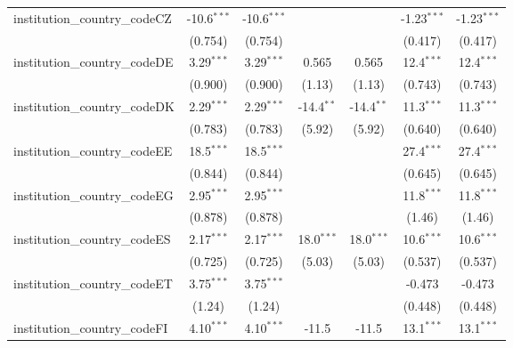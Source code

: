 \begin{tabular}{lcccccc}
   institution\_country\_codeCZ          & -10.6$^{***}$  & -10.6$^{***}$  &               &               & -1.23$^{***}$ & -1.23$^{***}$\\   
                                         & (0.754)        & (0.754)        &               &               & (0.417)       & (0.417)\\   
   institution\_country\_codeDE          & 3.29$^{***}$   & 3.29$^{***}$   & 0.565         & 0.565         & 12.4$^{***}$  & 12.4$^{***}$\\   
                                         & (0.900)        & (0.900)        & (1.13)        & (1.13)        & (0.743)       & (0.743)\\   
   institution\_country\_codeDK          & 2.29$^{***}$   & 2.29$^{***}$   & -14.4$^{**}$  & -14.4$^{**}$  & 11.3$^{***}$  & 11.3$^{***}$\\   
                                         & (0.783)        & (0.783)        & (5.92)        & (5.92)        & (0.640)       & (0.640)\\   
   institution\_country\_codeEE          & 18.5$^{***}$   & 18.5$^{***}$   &               &               & 27.4$^{***}$  & 27.4$^{***}$\\   
                                         & (0.844)        & (0.844)        &               &               & (0.645)       & (0.645)\\   
   institution\_country\_codeEG          & 2.95$^{***}$   & 2.95$^{***}$   &               &               & 11.8$^{***}$  & 11.8$^{***}$\\   
                                         & (0.878)        & (0.878)        &               &               & (1.46)        & (1.46)\\   
   institution\_country\_codeES          & 2.17$^{***}$   & 2.17$^{***}$   & 18.0$^{***}$  & 18.0$^{***}$  & 10.6$^{***}$  & 10.6$^{***}$\\   
                                         & (0.725)        & (0.725)        & (5.03)        & (5.03)        & (0.537)       & (0.537)\\   
   institution\_country\_codeET          & 3.75$^{***}$   & 3.75$^{***}$   &               &               & -0.473        & -0.473\\   
                                         & (1.24)         & (1.24)         &               &               & (0.448)       & (0.448)\\   
   institution\_country\_codeFI          & 4.10$^{***}$   & 4.10$^{***}$   & -11.5         & -11.5         & 13.1$^{***}$  & 13.1$^{***}$\\   

\end{tabular}

